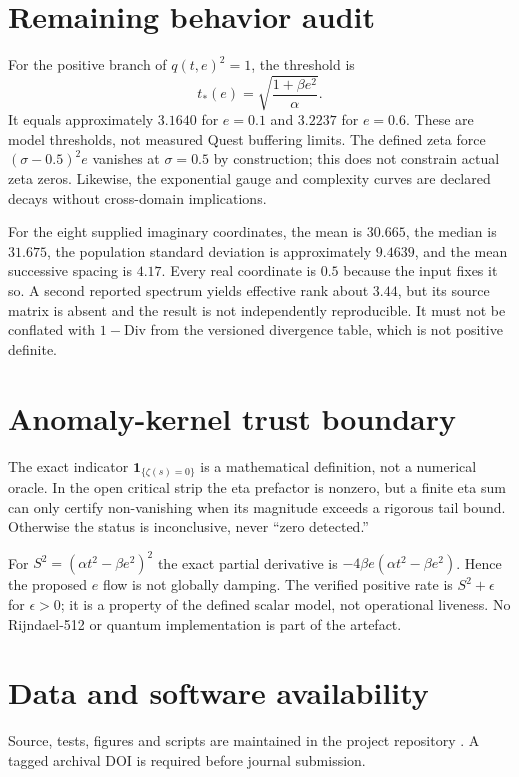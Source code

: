 \documentclass[11pt]{article}
\begin{document}
\section{Remaining behavior audit}
For the positive branch of $q(t,e)^2=1$, the threshold is
\[
t_*(e)=\sqrt{\frac{1+\beta e^2}{\alpha}}.
\]
It equals approximately $3.1640$ for $e=0.1$ and $3.2237$ for $e=0.6$.
These are model thresholds, not measured Quest buffering limits. The defined
zeta force $(\sigma-0.5)^2e$ vanishes at $\sigma=0.5$ by construction; this
does not constrain actual zeta zeros. Likewise, the exponential gauge and
complexity curves are declared decays without cross-domain implications.

For the eight supplied imaginary coordinates, the mean is $30.665$, the median
is $31.675$, the population standard deviation is approximately $9.4639$, and
the mean successive spacing is $4.17$. Every real coordinate is $0.5$ because
the input fixes it so. A second reported spectrum yields effective rank about
$3.44$, but its source matrix is absent and the result is not independently
reproducible. It must not be conflated with $1-\mathrm{Div}$ from the versioned
divergence table, which is not positive definite.

\section{Anomaly-kernel trust boundary}
The exact indicator $\mathbf{1}_{\{\zeta(s)=0\}}$ is a mathematical
definition, not a numerical oracle. In the open critical strip the eta
prefactor is nonzero, but a finite eta sum can only certify non-vanishing when
its magnitude exceeds a rigorous tail bound. Otherwise the status is
inconclusive, never ``zero detected.''

For $S^2=(\alpha t^2-\beta e^2)^2$ the exact partial derivative is
$-4\beta e(\alpha t^2-\beta e^2)$. Hence the proposed $e$ flow is not globally
damping. The verified positive rate is $S^2+\epsilon$ for $\epsilon>0$; it is a
property of the defined scalar model, not operational liveness. No
Rijndael-512 or quantum implementation is part of the artefact.

\section*{Data and software availability}
Source, tests, figures and scripts are maintained in the project repository
\cite{repository2026}. A tagged archival DOI is required before journal
submission.
\end{document}
